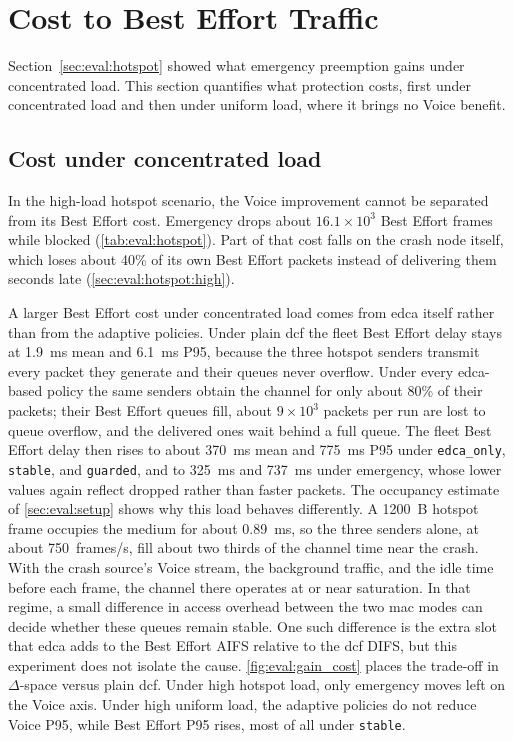 \section{Cost to Best Effort Traffic}
\label{sec:eval:cost}

Section~\ref{sec:eval:hotspot} showed what emergency preemption gains under concentrated load.
This section quantifies what protection costs, first under concentrated load and then under uniform load, where it brings no Voice benefit.

\subsection{Cost under concentrated load}
\label{sec:eval:cost:hotspot}

In the high-load hotspot scenario, the Voice improvement cannot be separated from its Best Effort cost.
Emergency drops about $16.1\times10^{3}$ Best Effort frames while blocked (\autoref{tab:eval:hotspot}).
Part of that cost falls on the crash node itself, which loses about 40\% of its own Best Effort packets instead of delivering them seconds late (\autoref{sec:eval:hotspot:high}).

A larger Best Effort cost under concentrated load comes from \gls{edca} itself rather than from the adaptive policies.
Under plain \gls{dcf} the fleet Best Effort delay stays at 1.9~ms mean and 6.1~ms P95, because the three hotspot senders transmit every packet they generate and their queues never overflow.
Under every \gls{edca}-based policy the same senders obtain the channel for only about 80\% of their packets; their Best Effort queues fill, about $9\times10^{3}$ packets per run are lost to queue overflow, and the delivered ones wait behind a full queue.
The fleet Best Effort delay then rises to about 370~ms mean and 775~ms P95 under \texttt{edca\_only}, \texttt{stable}, and \texttt{guarded}, and to 325~ms and 737~ms under emergency, whose lower values again reflect dropped rather than faster packets.
The occupancy estimate of \autoref{sec:eval:setup} shows why this load behaves differently.
A 1200~B hotspot frame occupies the medium for about 0.89~ms, so the three senders alone, at about 750~frames/s, fill about two thirds of the channel time near the crash.
With the crash source's Voice stream, the background traffic, and the idle time before each frame, the channel there operates at or near saturation.
In that regime, a small difference in access overhead between the two \gls{mac} modes can decide whether these queues remain stable.
One such difference is the extra slot that \gls{edca} adds to the Best Effort AIFS relative to the \gls{dcf} DIFS, but this experiment does not isolate the cause.
\autoref{fig:eval:gain_cost} places the trade-off in $\Delta$-space versus plain \gls{dcf}.
Under high hotspot load, only emergency moves left on the Voice axis.
Under high uniform load, the adaptive policies do not reduce Voice P95, while Best Effort P95 rises, most of all under \texttt{stable}.

